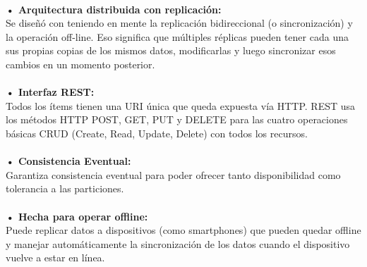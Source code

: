 \documentclass[twoside,onecolumn]{article}
\begin{document}
\begin{flushright}
\begin{itemize}
\textbf{}\\
\textbf{•	Arquitectura distribuida con replicación: }\\
Se diseñó con teniendo en mente la replicación bidireccional (o sincronización) y la operación off-line. Eso significa que múltiples réplicas pueden tener cada una sus propias copias de los mismos datos, modificarlas y luego sincronizar esos cambios en un momento posterior.
\textbf{}\\
\textbf{}\\
\textbf{•	Interfaz REST:}\\
 Todos los ítems tienen una URI única que queda expuesta vía HTTP. REST usa los métodos HTTP POST, GET, PUT y DELETE para las cuatro operaciones básicas CRUD (Create, Read, Update, Delete) con todos los recursos.
\textbf{}\\
\textbf{}\\
\textbf{•	Consistencia Eventual:}\\
 Garantiza consistencia eventual para poder ofrecer tanto disponibilidad como tolerancia a las particiones.
\textbf{}\\
\textbf{}\\
\textbf{•	Hecha para operar offline:}\\
 Puede replicar datos a dispositivos (como smartphones) que pueden quedar offline y manejar automáticamente la sincronización de los datos cuando el dispositivo vuelve a estar en línea.


\textbf{}\\
\textbf{}\\
\textbf{}\\
\textbf{}\\


\end{itemize}
\end{flushright}
\end{document}
